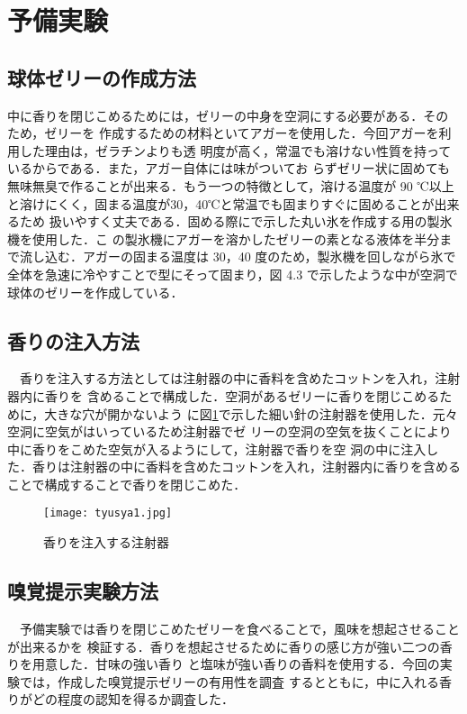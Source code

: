 \section{予備実験}




\subsection{球体ゼリーの作成方法}

中に香りを閉じこめるためには，ゼリーの中身を空洞にする必要がある．そのため，ゼリーを
作成するための材料といてアガーを使用した．今回アガーを利用した理由は，ゼラチンよりも透
明度が高く，常温でも溶けない性質を持っているからである．また，アガー自体には味がついてお
らずゼリー状に固めても無味無臭で作ることが出来る．もう一つの特徴として，溶ける温度が 90
℃以上と溶けにくく，固まる温度が30，40℃と常温でも固まりすぐに固めることが出来るため
扱いやすく丈夫である．固める際にで示した丸い氷を作成する用の製氷機を使用した．こ
の製氷機にアガーを溶かしたゼリーの素となる液体を半分まで流し込む．アガーの固まる温度は
30，40 度のため，製氷機を回しながら氷で全体を急速に冷やすことで型にそって固まり，図 4.3
で示したような中が空洞で球体のゼリーを作成している．


\subsection{香りの注入方法}
　香りを注入する方法としては注射器の中に香料を含めたコットンを入れ，注射器内に香りを
含めることで構成した．空洞があるゼリーに香りを閉じこめるために，大きな穴が開かないよう
に図\ref{tyusya}で示した細い針の注射器を使用した．元々空洞に空気がはいっているため注射器でゼ
リーの空洞の空気を抜くことにより中に香りをこめた空気が入るようにして，注射器で香りを空
洞の中に注入した．香りは注射器の中に香料を含めたコットンを入れ，注射器内に香りを含める
ことで構成することで香りを閉じこめた．

\begin{figure}[t]
    \centering
    \texttt{[image: tyusya1.jpg]}
    \caption{香りを注入する注射器}
    \label{tyusya}
  \end{figure}


\subsection{嗅覚提示実験方法}

　予備実験では香りを閉じこめたゼリーを食べることで，風味を想起させることが出来るかを
検証する．香りを想起させるために香りの感じ方が強い二つの香りを用意した．甘味の強い香り
と塩味が強い香りの香料を使用する．今回の実験では，作成した嗅覚提示ゼリーの有用性を調査
するとともに，中に入れる香りがどの程度の認知を得るか調査した．


